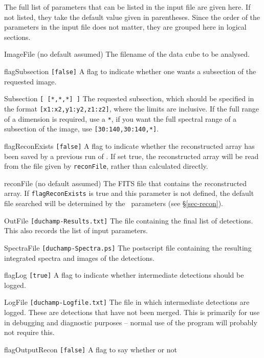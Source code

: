 \label{app-param}

The full list of parameters that can be listed in the input file are
given here. If not listed, they take the default value given in
parentheses. Since the order of the parameters in the input file does
not matter, they are grouped here in logical sections.

\begin{entry}
\item[ImageFile (no default assumed)] The filename of the
  data cube to be analysed.
\item[flagSubsection \texttt{[false]}] A flag to indicate whether one
  wants a subsection of the requested image.
\item[Subsection \texttt{[ [*,*,*] ]}] The requested subsection, which
  should be specified in the format \texttt{[x1:x2,y1:y2,z1:z2]},
  where the limits are inclusive. If the full range of a dimension is
  required, use a \texttt{*}, \eg if you want the full spectral range
  of a subsection of the image, use \texttt{[30:140,30:140,*]}.
\item[flagReconExists \texttt{[false]}] A flag to indicate whether the
  reconstructed array has been saved by a previous run of \duchamp. If
  set true, the reconstructed array will be read from the file given
  by \texttt{reconFile}, rather than calculated directly.
\item[reconFile (no default assumed)] The FITS file that contains the
  reconstructed array. If \texttt{flagReconExists} is true and this
  parameter is not defined, the default file searched will be
  determined by the \atrous\ parameters (see \S\ref{sec-recon}).
\item[OutFile \texttt{[duchamp-Results.txt]}] The file containing the
  final list of detections. This also records the list of input
  parameters.
\item[SpectraFile \texttt{[duchamp-Spectra.ps]}] The postscript file
  containing the resulting integrated spectra and images of the
  detections. 
\item[flagLog \texttt{[true]}] A flag to indicate whether intermediate
  detections should be logged.
\item[LogFile \texttt{[duchamp-Logfile.txt]}] The file in which
  intermediate detections are logged. These are detections that have
  not been merged. This is primarily for use in debugging and
  diagnostic purposes -- normal use of the program will probably not
  require this.
\item[flagOutputRecon \texttt{[false]}] A flag to say whether or not

\end{entry}
